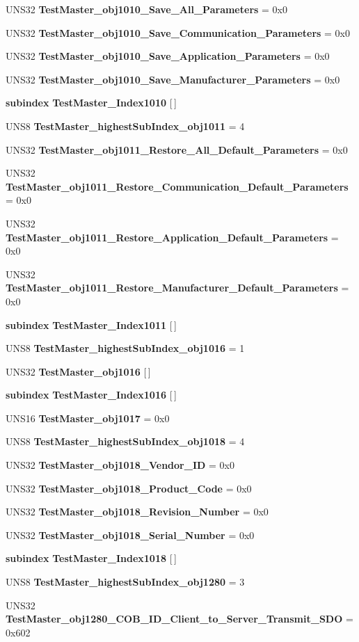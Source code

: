 \begin{CompactItemize}
UNS32 {\bf Test\-Master\_\-obj1010\_\-Save\_\-All\_\-Parameters} = 0x0
\item 
UNS32 {\bf Test\-Master\_\-obj1010\_\-Save\_\-Communication\_\-Parameters} = 0x0
\item 
UNS32 {\bf Test\-Master\_\-obj1010\_\-Save\_\-Application\_\-Parameters} = 0x0
\item 
UNS32 {\bf Test\-Master\_\-obj1010\_\-Save\_\-Manufacturer\_\-Parameters} = 0x0
\item 
{\bf subindex} {\bf Test\-Master\_\-Index1010} [$\,$]
\item 
UNS8 {\bf Test\-Master\_\-highest\-Sub\-Index\_\-obj1011} = 4
\item 
UNS32 {\bf Test\-Master\_\-obj1011\_\-Restore\_\-All\_\-Default\_\-Parameters} = 0x0
\item 
UNS32 {\bf Test\-Master\_\-obj1011\_\-Restore\_\-Communication\_\-Default\_\-Parameters} = 0x0
\item 
UNS32 {\bf Test\-Master\_\-obj1011\_\-Restore\_\-Application\_\-Default\_\-Parameters} = 0x0
\item 
UNS32 {\bf Test\-Master\_\-obj1011\_\-Restore\_\-Manufacturer\_\-Default\_\-Parameters} = 0x0
\item 
{\bf subindex} {\bf Test\-Master\_\-Index1011} [$\,$]
\item 
UNS8 {\bf Test\-Master\_\-highest\-Sub\-Index\_\-obj1016} = 1
\item 
UNS32 {\bf Test\-Master\_\-obj1016} [$\,$]
\item 
{\bf subindex} {\bf Test\-Master\_\-Index1016} [$\,$]
\item 
UNS16 {\bf Test\-Master\_\-obj1017} = 0x0
\item 
UNS8 {\bf Test\-Master\_\-highest\-Sub\-Index\_\-obj1018} = 4
\item 
UNS32 {\bf Test\-Master\_\-obj1018\_\-Vendor\_\-ID} = 0x0
\item 
UNS32 {\bf Test\-Master\_\-obj1018\_\-Product\_\-Code} = 0x0
\item 
UNS32 {\bf Test\-Master\_\-obj1018\_\-Revision\_\-Number} = 0x0
\item 
UNS32 {\bf Test\-Master\_\-obj1018\_\-Serial\_\-Number} = 0x0
\item 
{\bf subindex} {\bf Test\-Master\_\-Index1018} [$\,$]
\item 
UNS8 {\bf Test\-Master\_\-highest\-Sub\-Index\_\-obj1280} = 3
\item 
UNS32 {\bf Test\-Master\_\-obj1280\_\-COB\_\-ID\_\-Client\_\-to\_\-Server\_\-Transmit\_\-SDO} = 0x602

\end{CompactItemize}
